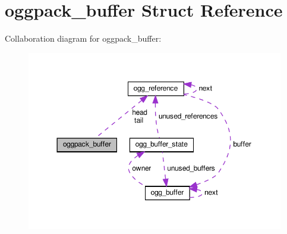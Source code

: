 \hypertarget{structoggpack__buffer}{}\section{oggpack\+\_\+buffer Struct Reference}
\label{structoggpack__buffer}


Collaboration diagram for oggpack\+\_\+buffer\+:
\nopagebreak
\begin{figure}[H]
\begin{center}
\leavevmode
\includegraphics[width=350pt]{structoggpack__buffer__coll__graph}
\end{center}
\end{figure}

